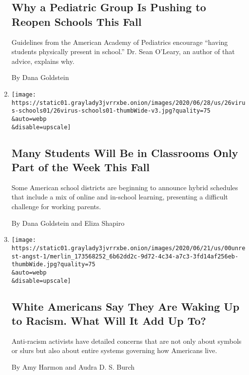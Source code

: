 \begin{enumerate}
  \hypertarget{why-a-pediatric-group-is-pushing-to-reopen-schools-this-fall}{%
  \subsection{Why a Pediatric Group Is Pushing to Reopen Schools This
  Fall}\label{why-a-pediatric-group-is-pushing-to-reopen-schools-this-fall}}

  Guidelines from the American Academy of Pediatrics encourage ``having
  students physically present in school.'' Dr. Sean O'Leary, an author
  of that advice, explains why.

  By Dana Goldstein
\item
  \href{/2020/06/26/us/coronavirus-schools-reopen-fall.html}{}

  \texttt{[image: https://static01.graylady3jvrrxbe.onion/images/2020/06/28/us/26virus-schools01/26virus-schools01-thumbWide-v3.jpg?quality=75\\\&auto=webp\\\&disable=upscale]}

  \hypertarget{many-students-will-be-in-classrooms-only-part-of-the-week-this-fall}{%
  \subsection{Many Students Will Be in Classrooms Only Part of the Week
  This
  Fall}\label{many-students-will-be-in-classrooms-only-part-of-the-week-this-fall}}

  Some American school districts are beginning to announce hybrid
  schedules that include a mix of online and in-school learning,
  presenting a difficult challenge for working parents.

  By Dana Goldstein and Eliza Shapiro
\item
  \href{/2020/06/22/us/racism-white-americans.html}{}

  \texttt{[image: https://static01.graylady3jvrrxbe.onion/images/2020/06/21/us/00unrest-angst-1/merlin\_173568252\_6b62dd2c-9d72-4c34-a7c3-3fd14af256eb-thumbWide.jpg?quality=75\\\&auto=webp\\\&disable=upscale]}

  \hypertarget{white-americans-say-they-are-waking-up-to-racism-what-will-it-add-up-to}{%
  \subsection{White Americans Say They Are Waking Up to Racism. What
  Will It Add Up
  To?}\label{white-americans-say-they-are-waking-up-to-racism-what-will-it-add-up-to}}

  Anti-racism activists have detailed concerns that are not only about
  symbols or slurs but also about entire systems governing how Americans
  live.

  By Amy Harmon and Audra D. S. Burch
\end{enumerate}

